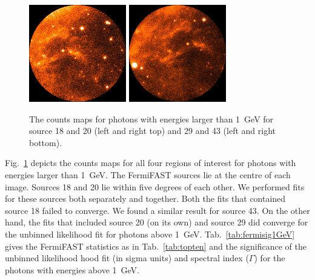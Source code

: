 \documentclass[useAMS,usenatbib]{mn2e}
\begin{document}
\begin{figure}
  \includegraphics[width=0.45\columnwidth]{src_29_1GeV}
  \includegraphics[width=0.45\columnwidth]{src_43_1GeV}
  \caption{The counts maps for photons with energies larger than 1~GeV
    for source 18 and 20 (left and right top) and 29 and 43 (left and
    right bottom).}
  \label{fig:1GeVcmap}
\end{figure}
Fig.~\ref{fig:1GeVcmap} depicts the counts maps for all four regions
of interest for photons with energies larger than 1~GeV.  The
FermiFAST sources lie at the centre of each image. Sources 18 and 20
lie within five degrees of each other.  We performed fits for these
sources both separately and together.  Both the fits that contained
source 18 failed to converge.  We found a similar result for source
43.  On the other hand, the fits that included source 20 (on its own)
and source 29 did converge for the unbinned likelihood fit for photons
above 1~GeV. Tab.~\ref{tab:fermisig1GeV} gives the FermiFAST
statistics as in Tab.~\ref{tab:topten} and the significance of the
unbinned likelihood hood fit (in sigma units) and spectral index
($\Gamma$) for the photons with energies above 1~GeV.
\end{document}
